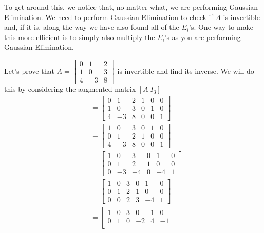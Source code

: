 To get around this, we notice that, no matter what, we are performing Gaussian Elimination. We need to perform Gaussian Elimination to check if $A$ is invertible and, if it is, along the way we have also found all of the $E_i$'s. One way to make this more efficient is to simply also multiply the $E_i$'s as you are performing Gaussian Elimination.
\begin{example}
    Let's prove that $A=\begin{bmatrix}
        0 & 1 & 2 \\
        1 & 0 & 3 \\
        4 & -3 & 8
    \end{bmatrix}$ is invertible and find its inverse. We will do this by considering the augmented matrix $[A|I_3]$
    \begin{align*}
        [A|I_3]&=\left[\begin{array}{ccc|ccc}
            0 & 1 & 2 & 1 & 0 & 0\\
            1 & 0 & 3 & 0 & 1 & 0\\
            4 & -3 & 8 & 0 & 0 & 1
        \end{array}\right]\\
        &=\left[\begin{array}{ccc|ccc}
            1 & 0 & 3 & 0 & 1 & 0\\
            0 & 1 & 2 & 1 & 0 & 0\\
            4 & -3 & 8 & 0 & 0 & 1
        \end{array}\right]\tag{swap rows 1 and 2}\\
        &=\left[\begin{array}{ccc|ccc}
            1 & 0 & 3 & 0 & 1 & 0\\
            0 & 1 & 2 & 1 & 0 & 0\\
            0 & -3 & -4 & 0 & -4 & 1
        \end{array}\right]\tag{add -4 times row 1 to row 3}\\
        &=\left[\begin{array}{ccc|ccc}
            1 & 0 & 3 & 0 & 1 & 0\\
            0 & 1 & 2 & 1 & 0 & 0\\
            0 & 0 & 2 & 3 & -4 & 1
        \end{array}\right]\tag{add 3 times row 2 to row 3}\\
        &=\left[\begin{array}{ccc|ccc}
            1 & 0 & 3 & 0 & 1 & 0\\
            0 & 1 & 0 & -2 & 4 & -1\\

\end{array}
\end{align*}
\end{example}
